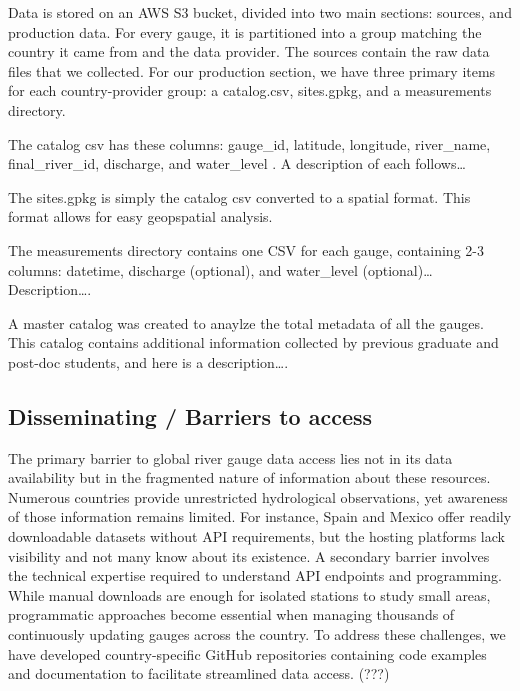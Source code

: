 Data is stored on an AWS S3 bucket, divided into two main sections: sources, and production data. For every gauge, it is partitioned into a group matching the country it came from and the data provider. The sources contain the raw data files that we collected. For our production section, we have three primary items for each country-provider group: a catalog.csv, sites.gpkg, and a measurements directory.

The catalog csv has these columns: gauge\_id, latitude, longitude, river\_name, final\_river\_id, discharge, and water\_level . A description of each follows\ldots

The sites.gpkg is simply the catalog csv converted to a spatial format. This format allows for easy geopspatial analysis.

The measurements directory contains one CSV for each gauge, containing 2-3 columns: datetime, discharge (optional), and water\_level (optional)\ldots{} Description\ldots.

A master catalog was created to anaylze the total metadata of all the gauges. This catalog contains additional information collected by previous graduate and post-doc students, and here is a description\ldots.

\subsection{Disseminating / Barriers to access}

The primary barrier to global river gauge data access lies not in its data availability but in the fragmented nature of information about these resources. Numerous countries provide unrestricted hydrological observations, yet awareness of those information remains limited. For instance, Spain and Mexico offer readily downloadable datasets without API requirements, but the hosting platforms lack visibility and not many know about its existence. A secondary barrier involves the technical expertise required to understand API endpoints and programming. While manual downloads are enough for isolated stations to study small areas, programmatic approaches become essential when managing thousands of continuously updating gauges across the country. To address these challenges, we have developed country-specific GitHub repositories containing code examples and documentation to facilitate streamlined data access. (???)

